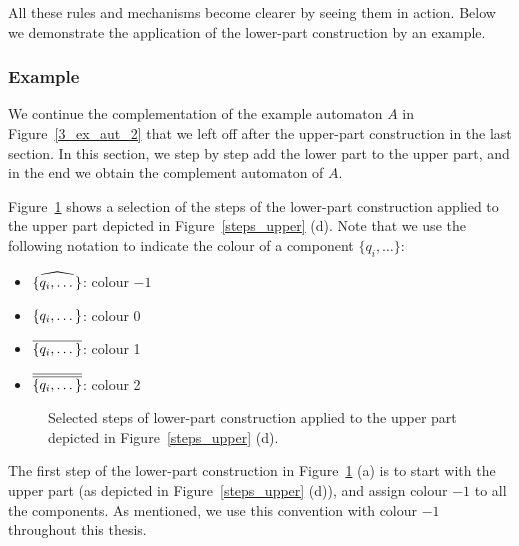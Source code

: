 All these rules and mechanisms become clearer by seeing them in action. Below we demonstrate the application of the lower-part construction by an example.

\subsubsection{Example}
We continue the complementation of the example automaton $A$ in Figure~\ref{3_ex_aut_2} that we left off after the upper-part construction in the last section. In this section, we step by step add the lower part to the upper part, and in the end we obtain the complement automaton of $A$.

Figure~\ref{steps_lower} shows a selection of the steps of the lower-part construction applied to the upper part depicted in Figure~\ref{steps_upper} (d). Note that we use the following notation to indicate the colour of a component $\{q_i, \dots \}$:
\begin{itemize}
\item $\cl^{\{q_i, \dots \}}$: colour $-1$
\item $\cl0{\{q_i, \dots \}}$: colour 0   %
\item $\cl1{\{q_i, \dots \}}$: colour 1   %
\item $\cl2{\{q_i, \dots \}}$: colour 2
\end{itemize}

\begin{figure}[htb]
\centering
  \begin{subfigure}[t]{0.49\textwidth}
  \centering
  \ComplementA
  \caption{}
  \end{subfigure}
  \hfill
  \begin{subfigure}[t]{0.49\textwidth}
  \centering
  \ComplementB
  \caption{}
  \end{subfigure}

  \begin{subfigure}[t]{0.49\textwidth}
  \centering
  \ComplementC
  \caption{}
  \end{subfigure}
  \hfill
  \begin{subfigure}[t]{0.49\textwidth}
  \centering
  \ComplementD
  \caption{}
  \end{subfigure}
\caption{Selected steps of lower-part construction applied to the upper part depicted in Figure~\ref{steps_upper} (d).}
\label{steps_lower}
\end{figure}

The first step of the lower-part construction in Figure~\ref{steps_lower} (a) is to start with the upper part (as depicted in Figure~\ref{steps_upper} (d)), and assign colour $-1$ to all the components. As mentioned, we use this convention with colour $-1$ throughout this thesis.

